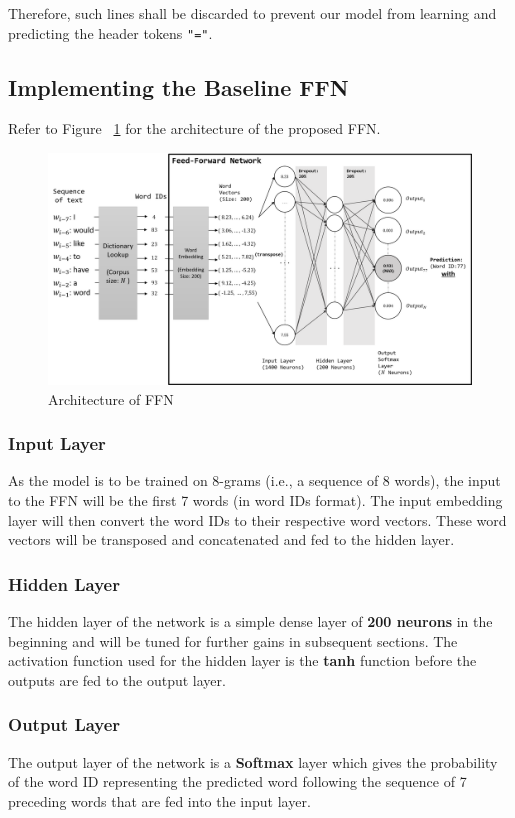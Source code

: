 \documentclass[sigconf,nonacm=true]{acmart}
\begin{document}
Therefore, such lines shall be discarded to prevent our model from learning 
and predicting the header tokens \verb|"="|.


\subsection{Implementing the Baseline FFN}

Refer to Figure ~\ref{fig:ffnarch} for the architecture of the proposed FFN.

\begin{figure}
	\centering
	\includegraphics[scale=0.52]{figures/ffn.png}
	\caption{Architecture of FFN}
	\label{fig:ffnarch}
	
\end{figure}


\subsubsection{Input Layer}
As the model is to be trained on 8-grams (i.e., a sequence of 8 words),
the input to the FFN will be the first 7 words (in word IDs format). The
input embedding layer will then convert the word IDs to their respective word vectors. These word vectors will be transposed and concatenated and fed to the hidden layer.

\subsubsection{Hidden Layer}
The hidden layer of the network is a simple dense layer of 
\textbf{200 neurons} in the beginning and will be tuned for further gains 
in subsequent sections. The activation function used for the hidden layer 
is the \textbf{tanh} function before the outputs are fed to the output layer.

\subsubsection{Output Layer}
The output layer of the network is a \textbf{Softmax} layer which gives 
the probability of the word ID representing the predicted word following 
the sequence of 7 preceding words that are fed into the input layer.
\end{document}
